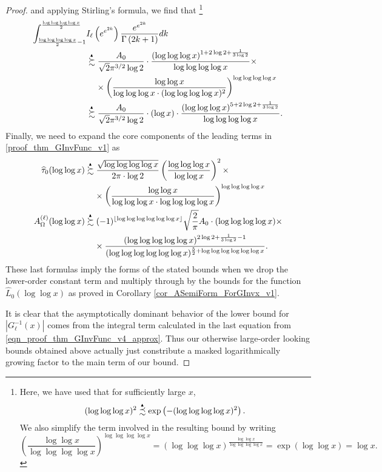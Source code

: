 \documentclass[11pt,reqno,a4letter]{article}
\numberwithin{figure}{section}
\numberwithin{table}{section}
\newcommand{\floor}[1]{\left\lfloor #1 \right\rfloor}
\theoremstyle{plain}
\numberwithin{theorem}{section}
\theoremstyle{definition}
\newcommand{\SuccSim}[0]{\overset{_{\scriptsize{\blacktriangle}}}{\succsim}}
\newcommand{\PrecSim}[0]{\overset{_{\scriptsize{\blacktriangle}}}{\precsim}}
\begin{document}
\begin{proof}
and applying Stirling's formula, we find that \footnote{ 
     Here, we have used that for sufficiently large $x$, 
     \[
     (\log\log\log x)^2 \PrecSim \exp\left(-(\log\log\log\log x)^2\right). 
     \]
     We also simplify the term involved in the resulting bound by writing 
     \[
     \left( 
          \frac{\log\log x}{\log\log\log\log x} 
          \right)^{\log\log\log\log x} = (\log\log\log x)^{\frac{\log\log x}{\log\log\log\log x}} = 
          \exp\left(\log\log x\right) = \log x. 
     \]
} 
\begin{align} 
\label{eqn_proof_thm_GInvFunc_v4_approx} 
\int_{\frac{\log\log\log\log x}{2}-1}^{\frac{\log\log\log\log x}{2}} & 
     I_{\ell}\left(e^{e^{2k}}\right) 
     \frac{e^{e^{2k}}}{\Gamma\left(2k + 1\right)} dk \\ 
\notag 
     & \SuccSim 
     \frac{A_0}{\sqrt{2} \pi^{3/2} \log 2} \cdot 
     \frac{(\log\log\log x)^{1 + 2\log 2 + \frac{1}{3\log 2}}}{ 
     \log\log\log\log x} \times \\ 
\notag 
     & \phantom{\SuccSim\ } \times 
     \left( 
     \frac{\log\log x}{\log\log\log x \cdot (\log\log\log\log x)^2} 
     \right)^{\log\log\log\log x} \\ 
\notag 
     & \SuccSim 
     \frac{A_0}{\sqrt{2} \pi^{3/2} \log 2} \cdot (\log x) \cdot 
     \frac{(\log\log\log x)^{5 + 2\log 2 + \frac{1}{3\log 2}}}{ 
     \log\log\log\log x}. 
\end{align} 
Finally, we need to expand the core components of the leading terms in 
\eqref{proof_thm_GInvFunc_v1} as 
\begin{align*} 
\widehat{\tau}_0(\log\log x) & \SuccSim 
     \frac{\sqrt{\log\log\log\log x}}{2\pi \cdot \log 2} \left(\frac{\log\log\log x}{\log\log x}\right)^2 
     \times \\ 
     & \phantom{\SuccSim\ } \times 
     \left(\frac{\log\log x}{\log\log\log x \cdot \log\log\log\log x}\right)^{\log\log\log\log x} \\ 
A_{\Omega}^{(\ell)}(\log\log x) & \SuccSim 
     (-1)^{\floor{\log\log\log\log\log\log x}} 
     \sqrt{\frac{2}{\pi}} A_0 \cdot (\log\log\log\log x) \times \\ 
     & \phantom{\SuccSim\ } \times 
     \frac{(\log\log\log\log\log x)^{2\log 2+ \frac{1}{3 \log 2} - 1}}{ 
     (\log\log\log\log\log\log x)^{\frac{5}{2} + \log\log\log\log\log\log x}}. 
\end{align*} 
These last formulas imply the forms of the stated bounds when we drop the lower-order 
constant term and multiply through by the bounds for the function 
$\widehat{L}_0(\log\log x)$ as proved in Corollary \ref{cor_ASemiForm_ForGInvx_v1}. 

It is clear that the asymptotically dominant behavior of the lower bound for 
$|G_{\ell}^{-1}(x)|$ comes from the integral term calculated in the last equation from 
\eqref{eqn_proof_thm_GInvFunc_v4_approx}. 
Thus our otherwise large-order looking bounds obtained above actually just 
constribute a masked logarithmically growing factor to the main term of our bound. 
\end{proof} 
\end{document}

